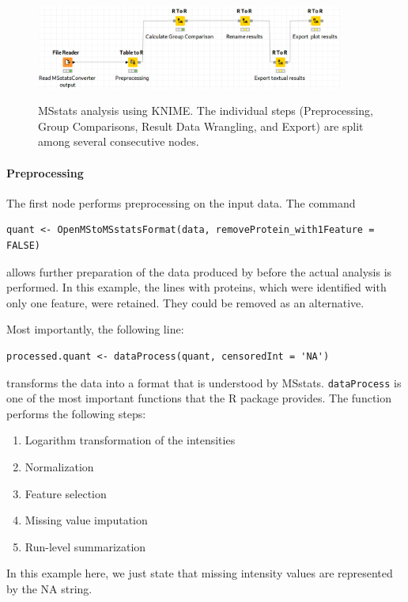 \begin{figure}[htbp]
	\centering
	\includegraphics[width=0.9\textwidth]{graphics/labelfree/msstats/MSstats.png}
	\label{fig:msstats_workflow}
	\caption{MSstats analysis using KNIME. The individual steps (Preprocessing,
	Group Comparisons, Result Data Wrangling, and Export) are split
among several consecutive nodes.}
\end{figure}


\paragraph{Preprocessing}
The first node performs preprocessing on the input data. The command
\begin{lstlisting}
quant <- OpenMStoMSstatsFormat(data, removeProtein_with1Feature = FALSE)
\end{lstlisting}
allows further preparation of the data produced by  before the actual analysis is performed. In this example, the 
lines with proteins, which were identified with only one feature, were retained. They could be removed as an alternative.

Most importantly, the following line:
\begin{lstlisting}
processed.quant <- dataProcess(quant, censoredInt = 'NA')
\end{lstlisting}
transforms the data into a format that is understood by MSstats.
\texttt{dataProcess} is one of the most important functions that the
R package provides. The function performs the following steps:
\begin{enumerate}
	\item
	Logarithm transformation of the intensities
	\item
	Normalization
	\item
	Feature selection
	\item
	Missing value imputation
	\item
	Run-level summarization
\end{enumerate}
In this example here, we just state that missing intensity values are represented by the NA string. 



